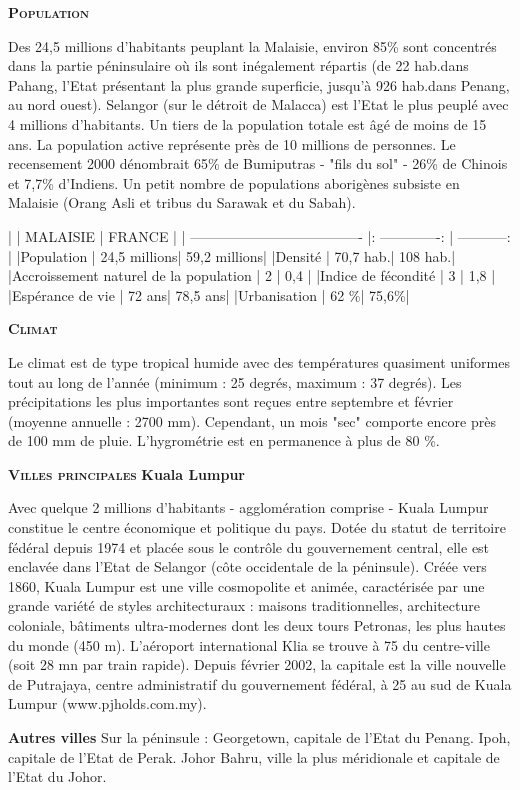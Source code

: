 \begin{multicols}{2}
\textbf{\textsc{Population}}

Des 24,5 millions d'habitants peuplant la Malaisie, environ 85\% sont concentrés dans la partie péninsulaire où ils sont inégalement répartis (de 22 hab.\kilo\meter\squared dans Pahang, l'Etat présentant la plus grande superficie, jusqu'à 926 hab.\kilo\meter\squared dans Penang, au nord ouest). Selangor (sur le détroit de Malacca) est l'Etat le plus peuplé avec 4 millions d'habitants. Un tiers de la population totale est âgé de moins de 15 ans. La population active représente près de 10 millions de personnes. Le recensement 2000 dénombrait 65\% de Bumiputras - "fils du sol" - 26\% de Chinois et 7,7\% d'Indiens. Un petit nombre de populations aborigènes subsiste en Malaisie (Orang Asli et tribus du Sarawak et du Sabah).

|                                       |     MALAISIE    |    FRANCE    |
| ------------------------------------- |: -------------: | -----------: |
|Population                             |    24,5 millions| 59,2 millions|
|Densité                                |     70,7 hab.\kilo\meter\squared|   108 hab.\kilo\meter\squared|
|Accroissement naturel de la population |               2 |          0,4 |
|Indice de fécondité                    |               3 |          1,8 |
|Espérance de vie                       |           72 ans|      78,5 ans|
|Urbanisation                           |             62 \%|         75,6\%|

\textbf{\textsc{Climat}}

Le climat est de type tropical humide avec des températures quasiment uniformes tout au long de l'année (minimum : 25 degrés, maximum : 37 degrés). Les précipitations les plus importantes sont reçues entre septembre et février (moyenne annuelle : 2700 mm). Cependant, un mois "sec" comporte encore près de 100 mm de pluie. L'hygrométrie est en permanence à plus de 80 \%.

\textbf{\textsc{Villes principales}}
\textbf{Kuala Lumpur}

Avec quelque 2 millions d'habitants - agglomération comprise - Kuala Lumpur constitue le centre économique et politique du pays. Dotée du statut de territoire fédéral depuis 1974 et placée sous le contrôle du gouvernement central, elle est enclavée dans l'Etat de Selangor (côte occidentale de la péninsule). Créée vers 1860, Kuala Lumpur est une ville cosmopolite et animée, caractérisée par une grande variété de styles architecturaux : maisons traditionnelles, architecture coloniale, bâtiments ultra-modernes dont les deux tours Petronas, les plus hautes du monde (450 m). L'aéroport international Klia se trouve à 75 \kilo\meter du centre-ville (soit 28 mn par train rapide). Depuis février 2002, la capitale est la ville nouvelle de Putrajaya, centre administratif du gouvernement fédéral, à 25 \kilo\meter au sud de Kuala Lumpur (www.pjholds.com.my).

\textbf{Autres villes}
Sur la péninsule : Georgetown, capitale de l'Etat du Penang. Ipoh, capitale de l'Etat de Perak. Johor Bahru, ville la plus méridionale et capitale de l'Etat du Johor.

\end{multicols}

